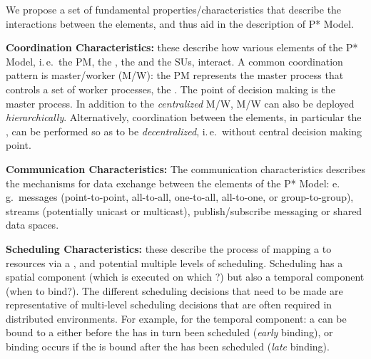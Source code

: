\documentclass[conference]{IEEEtran}
\begin{document}

 
We propose a set of fundamental properties/characteristics that
describe the interactions between the elements, and thus aid in the
description of P* Model.


\textbf{Coordination Characteristics:} these describe how
various elements of the P* Model, i.\,e.\ the PM, the \pilot, the \cus
and the SUs, interact. A common coordination pattern is master/worker
(M/W): the PM represents the master process that controls a set of
worker processes, the \pilots. The point of decision making is the
master process. In addition to the \emph{centralized} M/W, M/W can
also be deployed \emph{hierarchically}.  Alternatively, coordination
between the elements, in particular the \pilots, can be performed so as
to be \emph{decentralized}, i.\,e.\ without central decision making
point.

%

\textbf{Communication Characteristics:} The communication characteristics describes the
mechanisms for data exchange between the elements of the P* Model:
e.\,g.\ messages (point-to-point, all-to-all, one-to-all, all-to-one,
or group-to-group), streams (potentially unicast or multicast),
publish/subscribe messaging or shared data spaces.
		
\textbf{Scheduling Characteristics:} these describe the
process of mapping a \su to resources via a \pilot, and potential
multiple levels of scheduling. Scheduling has a spatial component
(which \su is executed on which \pilot?) but also a temporal component
(when to bind?). The different scheduling decisions that need to be
made are representative of multi-level scheduling decisions that are
often required in distributed environments.  For example, for the
temporal component: a \su can be bound to a \pilot either before
the \pilot has in turn been scheduled ({\it early} binding), or 
binding occurs if the \su is bound after the \pilot has been
scheduled ({\it late} binding).  
\end{document}
